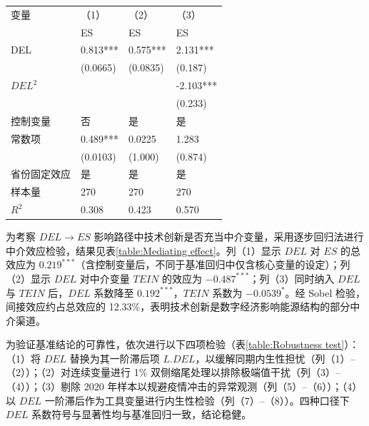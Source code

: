 \begin{center}
    \begin{tabular}{llll}
    \hline
    变量 & （1） & （2） & （3） \\
    ~ & ES & ES & ES \\
    \hline
    DEL & 0.813*** & 0.575*** & 2.131*** \\
    ~ & (0.0665) & (0.0835) & (0.187) \\
    $DEL^{2}$ & ~ & ~ & -2.103*** \\
    ~ & ~ & ~ & (0.233) \\
    控制变量&否&是&是\\
    常数项 & 0.489*** & 0.0225 & 1.283 \\
    ~ & (0.0103) & (1.000) & (0.874) \\
    省份固定效应 & 是 & 是 & 是 \\
    样本量 & 270 & 270 & 270 \\
    $R^{2}$ & 0.308 & 0.423 & 0.570 \\
    \hline
    \end{tabular}
\end{center}

为考察 $DEL\rightarrow ES$ 影响路径中技术创新是否充当中介变量，采用逐步回归法进行中介效应检验，结果见表\ref{table:Mediating effect}。列（1）显示 $DEL$ 对 $ES$ 的总效应为 $0.219^{***}$（含控制变量后，不同于基准回归中仅含核心变量的设定）；列（2）显示 $DEL$ 对中介变量 $TEIN$ 的效应为 $-0.487^{***}$；列（3）同时纳入 $DEL$ 与 $TEIN$ 后，$DEL$ 系数降至 $0.192^{***}$，$TEIN$ 系数为 $-0.0539^{*}$。经 Sobel 检验，间接效应约占总效应的 12.33\%，表明技术创新是数字经济影响能源结构的部分中介渠道。

为验证基准结论的可靠性，依次进行以下四项检验（表\ref{table:Robustness test}）：（1）将 $DEL$ 替换为其一阶滞后项 $L.DEL$，以缓解同期内生性担忧（列（1）--（2））；（2）对连续变量进行 1\% 双侧缩尾处理以排除极端值干扰（列（3）--（4））；（3）剔除 2020 年样本以规避疫情冲击的异常观测（列（5）--（6））；（4）以 $DEL$ 一阶滞后作为工具变量进行内生性检验（列（7）--（8））。四种口径下 $DEL$ 系数符号与显著性均与基准回归一致，结论稳健。

